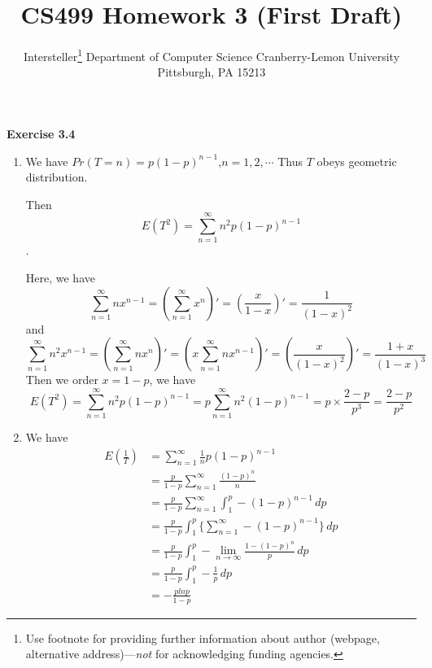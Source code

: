 \documentclass{article} %
\title{CS499 Homework 3 (First Draft)}
\author{
	Intersteller\thanks{ Use footnote for providing further information
		about author (webpage, alternative address)---\emph{not} for acknowledging
		funding agencies.}
	Department of Computer Science
	Cranberry-Lemon University
	Pittsburgh, PA 15213
}
\begin{document}
	\textbf{Exercise 3.4}\par
	\begin{enumerate}
	\item We have $Pr(T=n)=p(1-p)^{n-1}$,$n=1,2,\cdots$ Thus $T$ obeys geometric distribution.\par
	Then $$E(T^2)=\sum_{n=1}^\infty n^2p(1-p)^{n-1}$$.\par
	Here, we have 
	$$
	\sum_{n=1}^\infty nx^{n-1}=(\sum_{n=1}^\infty x^n)'=(\frac{x}{1-x})'=\frac{1}{(1-x)^2}
	$$
	and 
	$$
	\sum_{n=1}^\infty n^2x^{n-1}=(\sum_{n=1}^\infty nx^n)'=(x\sum_{n=1}^\infty nx^{n-1})'=(\frac{x}{(1-x)^2})'=\frac{1+x}{(1-x)^3}
	$$
	Then we order $x=1-p$, we have 
	$$
	E(T^2)=\sum_{n=1}^\infty n^2p(1-p)^{n-1}=p\sum_{n=1}^\infty n^2(1-p)^{n-1}=p\times \frac{2-p}{p^3}=\frac{2-p}{p^2}
	$$
	\item  We have 
	\begin{align*}
	E(\frac{1}{T})&=\sum_{n=1}^\infty \frac{1}{n} p(1-p)^{n-1}\\
	&=\frac{p}{1-p}\sum_{n=1}^\infty \frac{(1-p)^n}{n}\\
	&=\frac{p}{1-p}\sum_{n=1}^\infty \int_{1}^{p}-(1-p)^{n-1}\,dp\\
	&=\frac{p}{1-p}\int_{1}^{p}\{\sum_{n=1}^\infty -(1-p)^{n-1}\}\,dp\\
	&=\frac{p}{1-p}\int_{1}^{p}-\lim_{n\to\infty}\frac{1-(1-p)^{n}}{p}\,dp\\
	&=\frac{p}{1-p}\int_{1}^{p}-\frac{1}{p}\,dp\\
	&=-\frac{plnp}{1-p}
	\end{align*}
	\end{enumerate}
	
\end{document}
